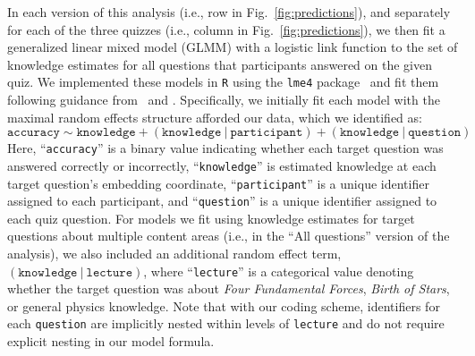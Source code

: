\documentclass[10pt]{article}
\begin{document}
In each version of this analysis (i.e., row in Fig.~\ref{fig:predictions}), and separately for each of the three quizzes (i.e., column in Fig.~\ref{fig:predictions}),  we then fit a generalized linear mixed model (GLMM) with a logistic link function to the set of knowledge estimates for all questions that participants answered on the given quiz.
We implemented these models in \texttt{R} using the \texttt{lme4} package~\citep{BateEtal15a} and fit them following guidance from~\citet{BateEtal15b} and \citet{MatuEtal17}. Specifically, we initially fit each model with the maximal random effects structure afforded our data, which we identified as:
\[
    \mathtt{accuracy \sim knowledge + (knowledge\ \vert\ participant) + (knowledge\ \vert\ question)}
\]
Here, ``\texttt{accuracy}'' is a binary value indicating whether each target question was answered correctly or incorrectly, ``\texttt{knowledge}'' is estimated knowledge at each target question's embedding coordinate, ``\texttt{participant}'' is a unique identifier assigned to each participant, and ``\texttt{question}'' is a unique identifier assigned to each quiz question.
For models we fit using knowledge estimates for target questions about multiple content areas (i.e., in the ``All questions'' version of the analysis), we also included an additional random effect term, $\mathtt{(knowledge\ \vert\ lecture)}$, where ``\texttt{lecture}'' is a categorical value denoting whether the target question was about \textit{Four Fundamental Forces}, \textit{Birth of Stars}, or general physics knowledge.
Note that with our coding scheme, identifiers for each \texttt{question} are implicitly nested within levels of \texttt{lecture} and do not require explicit nesting in our model formula.
\end{document}
